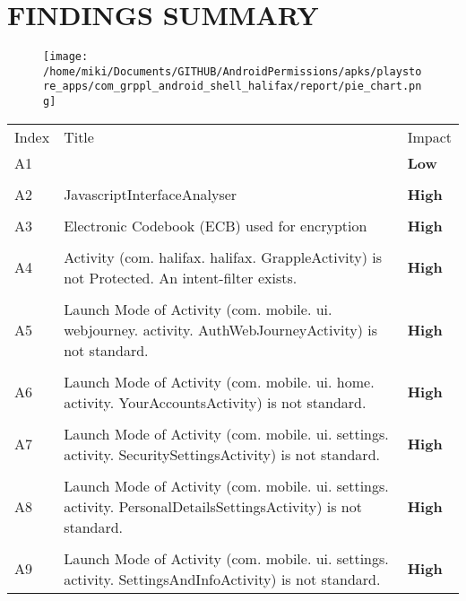 \documentclass[12p]{article}
\begin{document}
\section{FINDINGS SUMMARY}\label{sec:summary}
\begin{figure}[H]
\centering
	\texttt{[image: /home/miki/Documents/GITHUB/AndroidPermissions/apks/playstore\_apps/com\_grppl\_android\_shell\_halifax/report/pie\_chart.png]}
\end{figure}
	\begin{longtable}{p{0.5cm} p{10cm} p{1.5cm}}
	\rowcolor{grannysmithapple!70} Index & Title & Impact \\
	A1&& \color{amber}\textbf{Low} \\
\hline\\	A2&JavascriptInterfaceAnalyser& \color{ferrarired}\textbf{High} \\
\hline\\	A3&Electronic Codebook \newline (ECB) used for encryption& \color{ferrarired}\textbf{High} \\
\hline\\	A4&Activity \newline (com. halifax. halifax. GrappleActivity) is not Protected. An intent-filter exists.& \color{ferrarired}\textbf{High} \\
\hline\\	A5&Launch Mode of Activity \newline (com. mobile. ui. webjourney. activity. AuthWebJourneyActivity) is not standard.& \color{ferrarired}\textbf{High} \\
\hline\\	A6&Launch Mode of Activity \newline (com. mobile. ui. home. activity. YourAccountsActivity) is not standard.& \color{ferrarired}\textbf{High} \\
\hline\\	A7&Launch Mode of Activity \newline (com. mobile. ui. settings. activity. SecuritySettingsActivity) is not standard.& \color{ferrarired}\textbf{High} \\
\hline\\	A8&Launch Mode of Activity \newline (com. mobile. ui. settings. activity. PersonalDetailsSettingsActivity) is not standard.& \color{ferrarired}\textbf{High} \\
\hline\\	A9&Launch Mode of Activity \newline (com. mobile. ui. settings. activity. SettingsAndInfoActivity) is not standard.& \color{ferrarired}\textbf{High} \\

\end{longtable}
\end{document}
